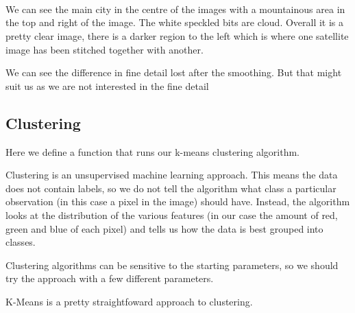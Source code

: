 \documentclass[11pt]{article}
\begin{document}
    \begin{center}
    \end{center}
    { \hspace*{\fill} \\}
    
    \begin{center}
    \end{center}
    { \hspace*{\fill} \\}
    
    \begin{center}
    \end{center}
    { \hspace*{\fill} \\}
    
    We can see the main city in the centre of the images with a mountainous
area in the top and right of the image. The white speckled bits are
cloud. Overall it is a pretty clear image, there is a darker region to
the left which is where one satellite image has been stitched together
with another.

We can see the difference in fine detail lost after the smoothing. But
that might suit us as we are not interested in the fine detail

    \subsection{Clustering}\label{clustering}

Here we define a function that runs our k-means clustering algorithm.

Clustering is an unsupervised machine learning approach. This means the
data does not contain labels, so we do not tell the algorithm what class
a particular observation (in this case a pixel in the image) should
have. Instead, the algorithm looks at the distribution of the various
features (in our case the amount of red, green and blue of each pixel)
and tells us how the data is best grouped into classes.

Clustering algorithms can be sensitive to the starting parameters, so we
should try the approach with a few different parameters.

K-Means is a pretty straightfoward approach to clustering.
\end{document}

